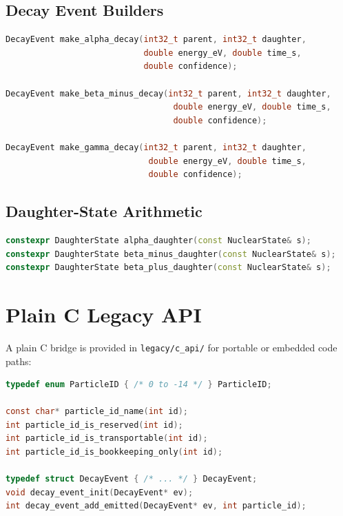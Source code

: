 \documentclass[11pt,a4paper]{article}
\begin{document}
\subsection{Decay Event Builders}

\begin{lstlisting}[language=C++]
DecayEvent make_alpha_decay(int32_t parent, int32_t daughter,
                            double energy_eV, double time_s,
                            double confidence);

DecayEvent make_beta_minus_decay(int32_t parent, int32_t daughter,
                                  double energy_eV, double time_s,
                                  double confidence);

DecayEvent make_gamma_decay(int32_t parent, int32_t daughter,
                             double energy_eV, double time_s,
                             double confidence);
\end{lstlisting}

\subsection{Daughter-State Arithmetic}

\begin{lstlisting}[language=C++]
constexpr DaughterState alpha_daughter(const NuclearState& s);
constexpr DaughterState beta_minus_daughter(const NuclearState& s);
constexpr DaughterState beta_plus_daughter(const NuclearState& s);
\end{lstlisting}

\section{Plain C Legacy API}
\label{sec:c-api}

A plain C bridge is provided in \texttt{legacy/c\_api/} for portable or embedded code paths:

\begin{lstlisting}[language=C]
typedef enum ParticleID { /* 0 to -14 */ } ParticleID;

const char* particle_id_name(int id);
int particle_id_is_reserved(int id);
int particle_id_is_transportable(int id);
int particle_id_is_bookkeeping_only(int id);

typedef struct DecayEvent { /* ... */ } DecayEvent;
void decay_event_init(DecayEvent* ev);
int decay_event_add_emitted(DecayEvent* ev, int particle_id);
\end{lstlisting}
\end{document}
